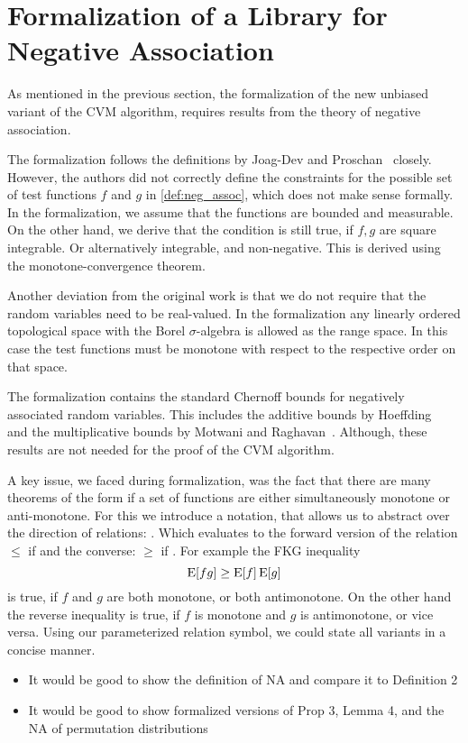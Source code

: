 \section{Formalization of a Library for Negative Association}\label{sec:formalization_neg_dep}
As mentioned in the previous section, the formalization of the new unbiased variant of the CVM algorithm, requires results from the theory of negative association.

The formalization follows the definitions by Joag-Dev and Proschan~\cite{joagdev1983} closely.
However, the authors did not correctly define the constraints for the possible set of test functions $f$ and $g$ in \cref{def:neg_assoc}, which does not make sense formally.
In the formalization, we assume that the functions are bounded and measurable.
On the other hand, we derive that the condition is still true, if $f, g$ are square integrable.
Or alternatively integrable, and non-negative.
This is derived using the monotone-convergence theorem.

Another deviation from the original work is that we do not require that the random variables need to be real-valued.
In the formalization any linearly ordered topological space with the Borel $\sigma$-algebra is allowed as the range space.
In this case the test functions must be monotone with respect to the respective order on that space.

The formalization contains the standard Chernoff bounds for negatively associated random variables.
This includes the additive bounds by Hoeffding~\cite[Th. 1, 2]{hoeffding1963} and the multiplicative bounds by Motwani and Raghavan~\cite[Th. 4.1, 4.2]{motwani1995}.
Although, these results are not needed for the proof of the CVM algorithm.

A key issue, we faced during formalization, was the fact that there are many theorems of the form if a set of functions are either simultaneously monotone or anti-monotone.
For this we introduce a notation, that allows us to abstract over the direction of relations: \isa{\isasymle\isasymge\isactrlbsub\isasymeta\isactrlesub}.
Which evaluates to the forward version of the relation $\leq$ if  and the converse: $\geq$ if .
For example the FKG inequality
\[
  \operatorname{\mathrm{E}} [f g] \geq \operatorname{\mathrm{E}} [f] \operatorname{\mathrm{E}} [g]
\]
is true, if $f$ and $g$ are both monotone, or both antimonotone.
On the other hand the reverse inequality is true, if $f$ is monotone and $g$ is antimonotone, or vice versa.
Using our parameterized relation symbol, we could state all variants in a concise manner.


\begin{itemize}
\item It would be good to show the definition of NA and compare it to Definition 2
\item It would be good to show formalized versions of Prop 3, Lemma 4, and the NA of permutation distributions
\end{itemize}

